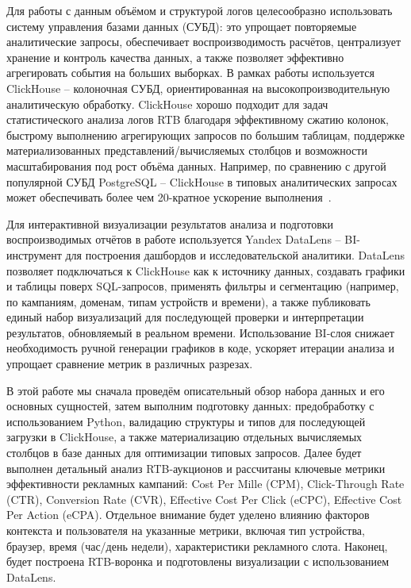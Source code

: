 Для работы с данным объёмом и структурой логов целесообразно использовать систему управления базами данных (СУБД): это упрощает повторяемые аналитические запросы, обеспечивает воспроизводимость расчётов, централизует хранение и контроль качества данных, а также позволяет эффективно агрегировать события на больших выборках. В рамках работы используется ClickHouse -- колоночная СУБД, ориентированная на высокопроизводительную аналитическую обработку. ClickHouse хорошо подходит для задач статистического анализа логов RTB благодаря эффективному сжатию колонок, быстрому выполнению агрегирующих запросов по большим таблицам, поддержке материализованных представлений/вычисляемых столбцов и возможности масштабирования под рост объёма данных. Например, по сравнению с другой популярной СУБД PostgreSQL -- ClickHouse в типовых аналитических запросах может обеспечивать более чем 20-кратное ускорение выполнения~\cite{clickhouse-vs-postgres}.

Для интерактивной визуализации результатов анализа и подготовки воспроизводимых отчётов в работе используется Yandex DataLens -- BI-инструмент для построения дашбордов и исследовательской аналитики. DataLens позволяет подключаться к ClickHouse как к источнику данных, создавать графики и таблицы поверх SQL-запросов, применять фильтры и сегментацию (например, по кампаниям, доменам, типам устройств и времени), а также публиковать единый набор визуализаций для последующей проверки и интерпретации результатов, обновляемый в реальном времени. Использование BI-слоя снижает необходимость ручной генерации графиков в коде, ускоряет итерации анализа и упрощает сравнение метрик в различных разрезах.

В этой работе мы сначала проведём описательный обзор набора данных и его основных сущностей, затем выполним подготовку данных: предобработку с использованием Python, валидацию структуры и типов для последующей загрузки в ClickHouse, а также материализацию отдельных вычисляемых столбцов в базе данных для оптимизации типовых запросов. Далее будет выполнен детальный анализ RTB-аукционов и рассчитаны ключевые метрики эффективности рекламных кампаний: Cost Per Mille (CPM), Click-Through Rate (CTR), Conversion Rate (CVR), Effective Cost Per Click (eCPC), Effective Cost Per Action (eCPA). Отдельное внимание будет уделено влиянию факторов контекста и пользователя на указанные метрики, включая тип устройства, браузер, время (час/день недели), характеристики рекламного слота. Наконец, будет построена RTB-воронка и подготовлены визуализации с использованием DataLens.


